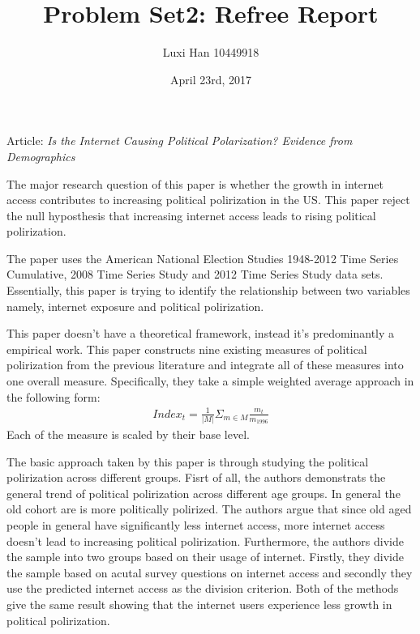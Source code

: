\documentclass[12pt]{article}%
\title{Problem Set2: Refree Report}
\author{Luxi Han 10449918}
\date{April 23rd, 2017}
\theoremstyle{definition}
\numberwithin{equation}{section}
\begin{document}
\maketitle

Article: \textit{Is the Internet Causing Political Polarization? Evidence from Demographics}

The major research question of this paper is whether the growth in internet access contributes to increasing political polirization in the US. This paper reject the null hyposthesis that increasing internet access leads to rising political polirization. \par

The paper uses the American National Election Studies 1948-2012 Time Series Cumulative, 2008 Time Series Study and 2012  Time Series Study data sets. Essentially, this paper is trying to identify the relationship between two variables namely, internet exposure and political polirization. \par

This paper doesn't have a theoretical framework, instead it's predominantly a empirical work. This paper constructs nine existing measures of political polirization from the previous literature and integrate all of these measures into one overall measure. Specifically, they take a simple weighted average approach in the following form:
\begin{align*}
Index_t = \frac{1}{|M|}\Sigma_{m\in M}\frac{m_t}{m_1996}
\end{align*}
Each of the measure is scaled by their base level.\par

The basic approach taken by this paper is through studying the political polirization across different groups. Fisrt of all, the authors demonstrats the general trend of political polirization across different age groups. In general the old cohort are is more politically polirized. The authors argue that since old aged people in general have significantly less internet access, more internet access doesn't lead to increasing political polirization. Furthermore, the authors divide the sample into two groups based on their usage of internet. Firstly, they divide the sample based on acutal survey questions on internet access and secondly they use the predicted internet access as the division criterion. Both of the methods give the same result showing that the internet users experience less growth in political polirization.\par
\end{document}
